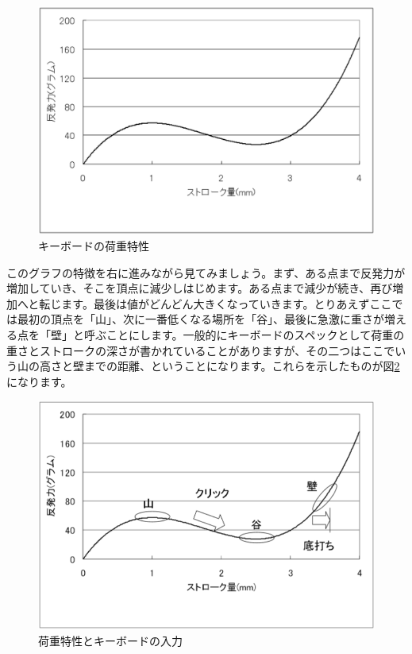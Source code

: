 \begin{figure}
 \begin{center}
   \includegraphics[width=14cm,clip]{res_eigh/img4.eps}
 \end{center}
 \caption{キーボードの荷重特性}
 \label{eigh:img4}
\end{figure}

このグラフの特徴を右に進みながら見てみましょう。まず、ある点まで反発力が増加していき、そこを頂点に減少しはじめます。ある点まで減少が続き、再び増加へと転じます。最後は値がどんどん大きくなっていきます。とりあえずここでは最初の頂点を「山」、次に一番低くなる場所を「谷」、最後に急激に重さが増える点を「壁」と呼ぶことにします。一般的にキーボードのスペックとして荷重の重さとストロークの深さが書かれていることがありますが、その二つはここでいう山の高さと壁までの距離、ということになります。これらを示したものが図\ref{eigh:img5}になります。

\begin{figure}
 \begin{center}
   \includegraphics[width=14cm,clip]{res_eigh/img5.eps}
 \end{center}
 \caption{荷重特性とキーボードの入力}
 \label{eigh:img5}
\end{figure}

